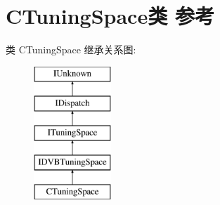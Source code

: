 \hypertarget{class_c_tuning_space}{}\section{C\+Tuning\+Space类 参考}
\label{class_c_tuning_space}
类 C\+Tuning\+Space 继承关系图\+:\begin{figure}[H]
\begin{center}
\leavevmode
\includegraphics[height=5.000000cm]{class_c_tuning_space}
\end{center}
\end{figure}
